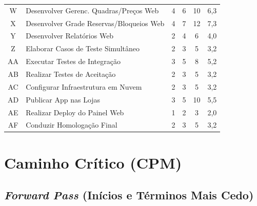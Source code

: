 \documentclass[12pt,a4paper,oneside]{report}
\begin{document}
\begin{longtable}{c p{5.5cm} c c c c}
W & Desenvolver Gerenc. Quadras/Preços Web & 4 & 6 & 10 & 6,3 \\
X & Desenvolver Grade Reservas/Bloqueios Web & 4 & 7 & 12 & 7,3 \\
Y & Desenvolver Relatórios Web & 2 & 4 & 6 & 4,0 \\
Z & Elaborar Casos de Teste Simultâneo & 2 & 3 & 5 & 3,2 \\
AA & Executar Testes de Integração & 3 & 5 & 8 & 5,2 \\
AB & Realizar Testes de Aceitação & 2 & 3 & 5 & 3,2 \\
AC & Configurar Infraestrutura em Nuvem & 2 & 3 & 5 & 3,2 \\
AD & Publicar App nas Lojas & 3 & 5 & 10 & 5,5 \\
AE & Realizar Deploy do Painel Web & 1 & 2 & 3 & 2,0 \\
AF & Conduzir Homologação Final & 2 & 3 & 5 & 3,2 \\
\end{longtable}

\section{Caminho Crítico (CPM)}

\subsection{\textit{Forward Pass} (Inícios e Términos Mais Cedo)}
\end{document}
